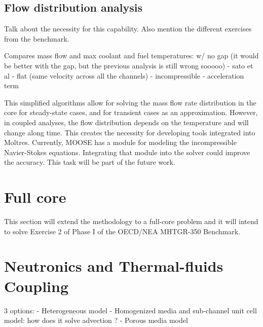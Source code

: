 \subsection{Flow distribution analysis}

Talk about the necessity for this capability.
Also mention the different exercises from the benchmark.

Compares mass flow and max coolant and fuel temperatures: w/ no gap (it would be better with the gap, but the previous analysis is still wrong sooooo)
- sato et al
- flat (same velocity across all the channels)
- incompressible
- acceleration term

This simplified algorithms allow for solving the mass flow rate distribution in the core for steady-state cases, and for transient cases as an approximation.
However, in coupled analyses, the flow distribution depends on the temperature and will change along time.
This creates the necessity for developing tools integrated into Moltres.
Currently, MOOSE has a module for modeling the incompressible Navier-Stokes equations.
Integrating that module into the solver could improve the accuracy.
This task will be part of the future work.

\section{Full core}

This section will extend the methodology to a full-core problem and it will intend to solve Exercise 2 of Phase I of the OECD/NEA MHTGR-350 Benchmark.

\section{Neutronics and Thermal-fluids Coupling}

3 options:
- Heterogeneous model
- Homogenized media and sub-channel unit cell model: how does it solve advection ?
- Porous media model
